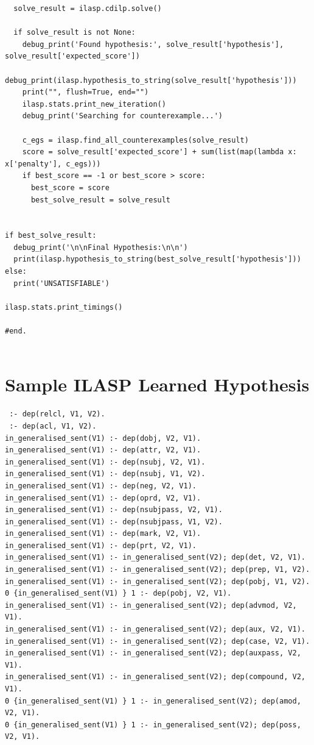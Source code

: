 \begin{lstlisting}
  solve_result = ilasp.cdilp.solve()

  if solve_result is not None:
    debug_print('Found hypothesis:', solve_result['hypothesis'], solve_result['expected_score'])
    debug_print(ilasp.hypothesis_to_string(solve_result['hypothesis']))
    print("", flush=True, end="")
    ilasp.stats.print_new_iteration()
    debug_print('Searching for counterexample...')

    c_egs = ilasp.find_all_counterexamples(solve_result)
    score = solve_result['expected_score'] + sum(list(map(lambda x: x['penalty'], c_egs)))
    if best_score == -1 or best_score > score:
      best_score = score
      best_solve_result = solve_result


if best_solve_result:
  debug_print('\n\nFinal Hypothesis:\n\n')
  print(ilasp.hypothesis_to_string(best_solve_result['hypothesis']))
else:
  print('UNSATISFIABLE')

ilasp.stats.print_timings()

#end.


\end{lstlisting}


\chapter{Sample ILASP Learned Hypothesis}
\label{learned-solution-example-appendix}

\begin{lstlisting}
 :- dep(relcl, V1, V2).
 :- dep(acl, V1, V2).
in_generalised_sent(V1) :- dep(dobj, V2, V1).
in_generalised_sent(V1) :- dep(attr, V2, V1).
in_generalised_sent(V1) :- dep(nsubj, V2, V1).
in_generalised_sent(V1) :- dep(nsubj, V1, V2).
in_generalised_sent(V1) :- dep(neg, V2, V1).
in_generalised_sent(V1) :- dep(oprd, V2, V1).
in_generalised_sent(V1) :- dep(nsubjpass, V2, V1).
in_generalised_sent(V1) :- dep(nsubjpass, V1, V2).
in_generalised_sent(V1) :- dep(mark, V2, V1).
in_generalised_sent(V1) :- dep(prt, V2, V1).
in_generalised_sent(V1) :- in_generalised_sent(V2); dep(det, V2, V1).
in_generalised_sent(V1) :- in_generalised_sent(V2); dep(prep, V1, V2).
in_generalised_sent(V1) :- in_generalised_sent(V2); dep(pobj, V1, V2).
0 {in_generalised_sent(V1) } 1 :- dep(pobj, V2, V1).
in_generalised_sent(V1) :- in_generalised_sent(V2); dep(advmod, V2, V1).
in_generalised_sent(V1) :- in_generalised_sent(V2); dep(aux, V2, V1).
in_generalised_sent(V1) :- in_generalised_sent(V2); dep(case, V2, V1).
in_generalised_sent(V1) :- in_generalised_sent(V2); dep(auxpass, V2, V1).
in_generalised_sent(V1) :- in_generalised_sent(V2); dep(compound, V2, V1).
0 {in_generalised_sent(V1) } 1 :- in_generalised_sent(V2); dep(amod, V2, V1).
0 {in_generalised_sent(V1) } 1 :- in_generalised_sent(V2); dep(poss, V2, V1).
\end{lstlisting}